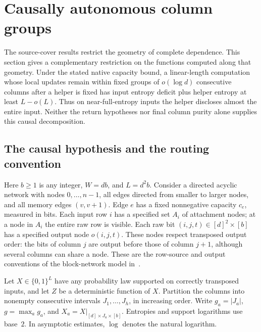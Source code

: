 \section{Causally autonomous column groups}\label{sec:causal-groups}

The source-cover results restrict the geometry of complete dependence.
This section gives a complementary restriction on the functions computed
along that geometry. Under the stated native capacity bound, a
linear-length computation whose local updates remain within fixed groups
of $o(\log d)$ consecutive columns after a helper is fixed has input
entropy deficit plus helper entropy at least $L-o(L)$. Thus on
near-full-entropy inputs the helper
discloses almost the entire input. Neither the return hypotheses nor
final column purity alone supplies this causal decomposition.

\subsection{The causal hypothesis and the routing convention}

Here $b\ge1$ is any integer, $W=db$, and $L=d^2b$.  Consider a directed
acyclic network with nodes $0,\ldots,n-1$, all edges directed from smaller
to larger nodes, and all memory edges $(v,v+1)$.  Edge $e$ has a fixed
nonnegative capacity $c_e$, measured in bits.  Each input row $i$ has a
specified set $A_i$ of attachment nodes; at a node in $A_i$ the entire
raw row is visible.  Each raw bit $(i,j,t)\in[d]^2\times[b]$ has a
specified output node $o(i,j,t)$.  These nodes respect transposed output
order: the bits of column $j$ are output before those of column $j+1$,
although several columns can share a node.  These are the row-source
and output conventions of the block-network model
in~\cite[section ``Codes on time--space diagrams'']{FirstPaper2026}.

Let $X\in\{0,1\}^{L}$ have any probability law supported on correctly
transposed inputs, and let $Z$ be a deterministic function of $X$.
Partition the columns into nonempty consecutive intervals
$J_1,\ldots,J_h$, in increasing order.  Write $g_a=|J_a|$,
$g=\max_a g_a$, and $X_a=X|_{[d]\times J_a\times[b]}$.
Entropies and support logarithms use base~$2$. In asymptotic estimates,
$\log$ denotes the natural logarithm.


